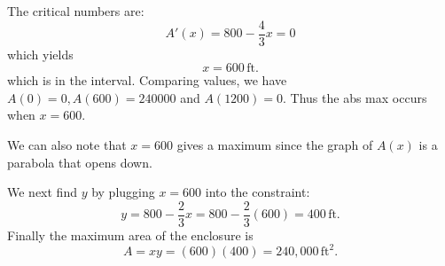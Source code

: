 \documentclass{ximera}
\begin{document}
\begin{example}[example 1]
The critical numbers are:
\[A'(x) = 800 - \frac43 x = 0 \]
which yields
\[x= 600 \,\mbox{ft.}\]
which is in the interval. Comparing values, we have $A(0) = 0, A(600) = 240000$ and $A(1200) = 0$.
Thus the abs max occurs when $x = 600$. 

We can also note that $x = 600$ gives a maximum since the graph of $A(x)$ is a parabola that opens down.


\begin{image}
\end{image}


We next find $y$ by plugging $x = 600$ into the constraint:
\[y = 800 - \frac23 x = 800 - \frac23(600) = 400 \,\mbox{ft.}\]
Finally the maximum area of the enclosure is
\[A = xy = (600)(400) = 240{,}000 \,\mbox{ft$^2$}.\]
\end{example}


\begin{center}
\begin{foldable}
\end{foldable}
\end{center}
\end{document}
